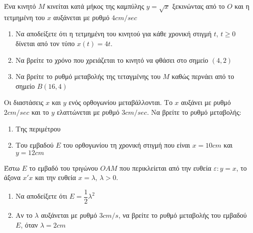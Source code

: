 \documentclass{presentation}
\begin{document}
\begin{askisi}
  Ένα κινητό $Μ$ κινείται κατά μήκος της καμπύλης $y=\sqrt{x}$ ξεκινώντας από το $Ο$ και η τετμημένη του $x$ αυξάνεται με ρυθμό $4cm/sec$
  \begin{enumerate}
    \item<1-> Να αποδείξετε ότι η τετμημένη του κινητού για κάθε χρονική στιγμή $t$, $t\ge 0$ δίνεται από τον τύπο $x(t)=4t$.
    \item<2-> Να βρείτε το χρόνο που χρειάζεται το κινητό να φθάσει στο σημείο $(4,2)$
    \item<3-> Να βρείτε το ρυθμό μεταβολής της τεταγμένης του $Μ$ καθώς περνάει από το σημείο $Β(16,4)$
  \end{enumerate}

\end{askisi}

\begin{askisi}
  Οι διαστάσεις $x$ και $y$ ενός ορθογωνίου μεταβάλλονται. Το $x$ αυξάνει με ρυθμό $2cm/sec$ και το $y$ ελαττώνεται με ρυθμό $3cm/sec$. Να βρείτε το ρυθμό μεταβολής:
  \begin{enumerate}
    \item<1-> Της περιμέτρου
    \item<2-> Του εμβαδού $Ε$ του ορθογωνίου τη χρονική στιγμή που είναι $x=10cm$ και $y=12cm$
  \end{enumerate}

\end{askisi}

\begin{askisi}
  Έστω $Ε$ το εμβαδό του τριγώνου $ΟΑΜ$ που περικλείεται από την ευθεία $ε:y=x$, το άξονα $x'x$ και την ευθεία $x=λ$, $λ>0$.
  \begin{enumerate}
    \item<1-> Να αποδείξετε ότι $Ε=\dfrac{1}{2}λ^2$
    \item<2-> Αν το $λ$ αυξάνεται με ρυθμό $3cm/s$, να βρείτε το ρυθμό μεταβολής του εμβαδού $Ε$, όταν $λ=2cm$
  \end{enumerate}

\end{askisi}
\end{document}
